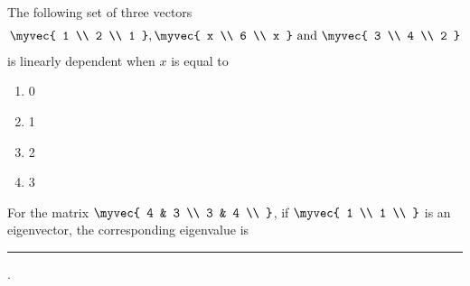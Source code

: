     \item The following set of three vectors
    \begin{align*}
        \myvec{
        1 \\
        2 \\
        1 
        },
        \myvec{
        x \\
        6 \\
        x 
	    } \text{ and }
        \myvec{
        3 \\
        4 \\
        2 
        }
    \end{align*}
is linearly dependent when $x$ is equal to 
\hfill{}
\begin{multicols}{4}
\begin{enumerate}
    \item 0
     \item 1
      \item 2
       \item 3
\end{enumerate}
\end{multicols}
    \item For the matrix $\myvec{
    4 & 3 \\
    3 & 4 \\
    }$, if $\myvec{
    1 \\
    1 \\
    }$ is an eigenvector, the corresponding eigenvalue is \rule{40pt}{0.1mm}.
\hfill{}
